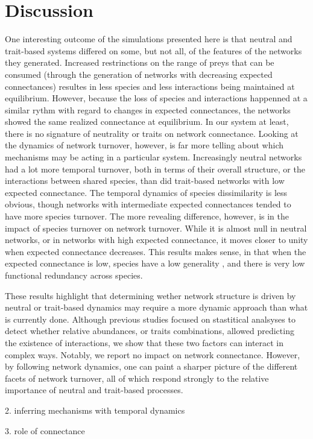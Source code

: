 \documentclass[10pt,twocolumn,fleqn]{article}
\begin{document}
\section{Discussion}

One interesting outcome of the simulations presented here is that neutral and
trait-based systems differed on some, but not all, of the features of the
networks they generated. Increased restrinctions on the range of preys that can
be consumed (through the generation of networks with decreasing expected
connectances) resultes in less species and less interactions being maintained at
equilibrium. However, because the loss of species and interactions happenned at
a similar rythm with regard to changes in expected connectances, the networks
showed the same realized connectance at equilibrium. In our system at least,
there is no signature of neutrality or traits on network connectance. Looking at
the dynamics of network turnover, however, is far more telling about which
mechanisms may be acting in a particular system. Increasingly neutral networks
had a lot more temporal turnover, both in terms of their overall structure, or
the interactions between shared species, than did trait-based networks with low
expected connectance. The temporal dynamics of species dissimilarity is less
obvious, though networks with intermediate expected connectances tended to have
more species turnover. The more revealing difference, however, is in the impact
of species turnover on network turnover. While it is almost null in neutral
networks, or in networks with high expected connectance, it moves closer to
unity when expected connectance decreases. This results makes sense, in that
when  the expected connectance is low, species have a low generality
\citep{schoener_food_1989}, and there is very low functional redundancy across
species.

These results highlight that determining wether network structure is driven by
neutral or trait-based dynamics may require a more dynamic approach than what is
currently done. Although previous studies focused on stastitical analsyses to
detect whether relative abundances, or traits combinations, allowed predicting
the existence of interactions, we show that these two factors can interact in
complex ways. Notably, we report no impact on network connectance. However, by
following network dynamics, one can paint a sharper picture of the different
facets of network turnover, all of which respond strongly to the relative
importance of neutral and trait-based processes.

2. inferring mechanisms with temporal dynamics

3. role of connectance

\printbibliography
\end{document}
